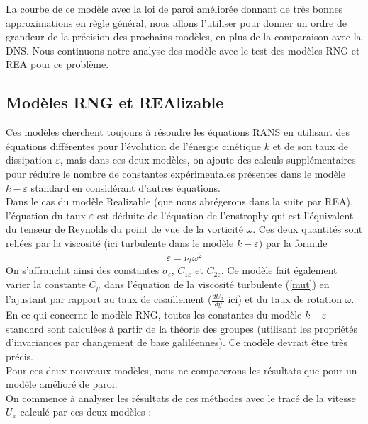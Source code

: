 \documentclass[a4paper,10pt]{article}
\newcommand{\keps}{$k-\varepsilon$}
\newcommand{\eci}{énergie cinétique}
\newcommand{\npurple}{\color{forest}}
\newcommand\black{\color{black}}
\begin{document}
La courbe de ce modèle avec la loi de paroi améliorée donnant de très bonnes approximations en règle général, nous allons l'utiliser pour donner un ordre de grandeur de la précision des prochains modèles, en plus de la comparaison avec la DNS. Nous continuons notre analyse des modèle avec le test des modèles RNG et REA pour ce problème. 

\npurple
\subsection{Modèles RNG et REAlizable} \black
Ces modèles cherchent toujours à résoudre les équations RANS en utilisant des équations différentes pour l'évolution de l'\eci $ $ $k$ et de son taux de dissipation $\varepsilon$, mais dans ces deux modèles, on ajoute des calculs supplémentaires pour réduire le nombre de constantes expérimentales présentes dans le modèle \keps $ $ standard en considérant d'autres équations.\\
 Dans le cas du modèle Realizable (que nous abrégerons dans la suite par REA), l'équation du taux $\varepsilon$ est déduite de l'équation de l'enstrophy qui est l'équivalent du tenseur de Reynolds du point de vue de la vorticité $\omega$. Ces deux quantités sont reliées par la viscosité (ici turbulente dans le modèle \keps) par la formule 
 \begin{equation*}
  \varepsilon = \nu_t \overline{\omega^2}
  \end{equation*} 
On s'affranchit ainsi des constantes $\sigma_\epsilon$, $C_{1 \varepsilon}$ et $C_{2 \varepsilon}$. Ce modèle fait également varier la constante $C_\mu$ dans l'équation de la viscosité turbulente (\ref{mut}) en l'ajustant par rapport au taux de cisaillement ($\frac{dU_x}{dy}$ ici) et du taux de rotation $\omega$. \\

\noindent En ce qui concerne le modèle RNG, toutes les constantes du modèle \keps $ $ standard sont calculées à partir de la théorie des groupes (utilisant les propriétés d'invariances par changement de base galiléennes). Ce modèle devrait être très précis. \\
Pour ces deux nouveaux modèles, nous ne comparerons les résultats que pour un modèle amélioré de paroi. \\

On commence à analyser les résultats de ces méthodes avec le tracé de la vitesse $U_x$ calculé par ces deux modèles :
 
\end{document}
